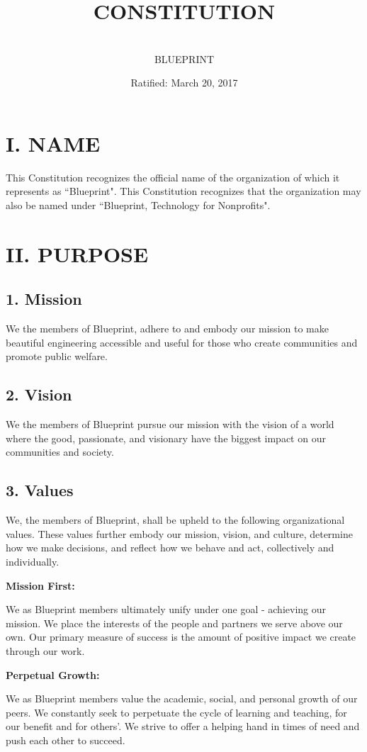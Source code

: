 \documentclass{article}
\title{CONSTITUTION}
\author{\\ \sc BLUEPRINT}
\date{Ratified: March 20, 2017 }
\begin{document}
\maketitle

\section{I. NAME}
This Constitution recognizes the official name of the organization of which it represents as ``Blueprint". This Constitution recognizes that the organization may also be named under ``Blueprint, Technology for Nonprofits".

\section{II. PURPOSE}
\subsection{1. Mission}
We the members of Blueprint, adhere to and embody our mission to make beautiful engineering accessible and useful for those who create communities and promote public welfare.

\subsection{2. Vision}
We the members of Blueprint pursue our mission with the vision of a world where the good, passionate, and visionary have the biggest impact on our communities and society.


\subsection{3. Values}
We, the members of Blueprint, shall be upheld to the following organizational values. These values further embody our mission, vision, and culture, determine how we make decisions, and reflect how we behave and act, collectively and individually.

\textbf{Mission First:}

We as Blueprint members ultimately unify under one goal -  achieving our mission. We place the interests of the people and partners we serve above our own. Our primary measure of success is the amount of positive impact we create through our work.

\textbf{Perpetual Growth:}

We as Blueprint members value the academic, social, and personal growth of our peers. We constantly seek to perpetuate the cycle of learning and teaching, for our benefit and for others’. We strive to offer a helping hand in times of need and push each other to succeed.
\end{document}
